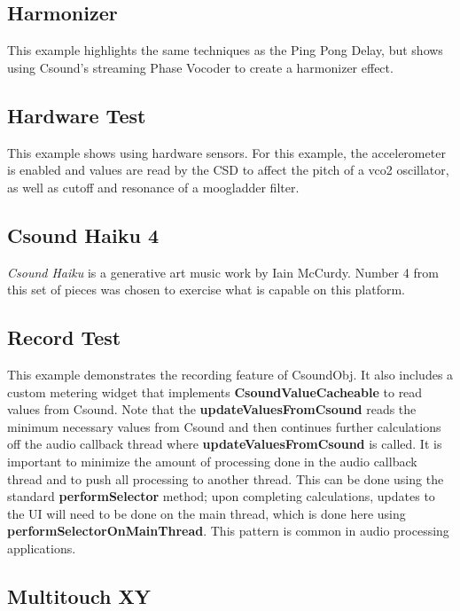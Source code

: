 \documentclass[11pt]{article}
\begin{document}
\subsection{Harmonizer}

This example highlights the same techniques as the Ping Pong Delay, but shows using Csound's streaming Phase Vocoder to create a harmonizer effect. 

\subsection{Hardware Test}

This example shows using hardware sensors.  For this example, the accelerometer is enabled and values are read by the CSD to affect the pitch of a vco2 oscillator, as well as cutoff and resonance of a moogladder filter. 

\subsection{Csound Haiku 4}

\emph{Csound Haiku} is a generative art music work by Iain McCurdy.  Number 4 from this set of pieces was chosen to exercise what is capable on this platform.

\subsection{Record Test}

This example demonstrates the recording feature of CsoundObj.  It also includes a custom metering widget that implements \textbf{CsoundValueCacheable} to read values from Csound.  Note that the \textbf{updateValuesFromCsound} reads the minimum necessary values from Csound and then continues further calculations off the audio callback thread where \textbf{updateValuesFromCsound} is called.  It is important to minimize the amount of processing done in the audio callback thread and to push all processing to another thread.  This can be done using the standard \textbf{performSelector} method; upon completing calculations, updates to the UI will need to be done on the main thread, which is done here using \textbf{performSelectorOnMainThread}.  This pattern is common in audio processing applications. 

\subsection{Multitouch XY}
\end{document}
